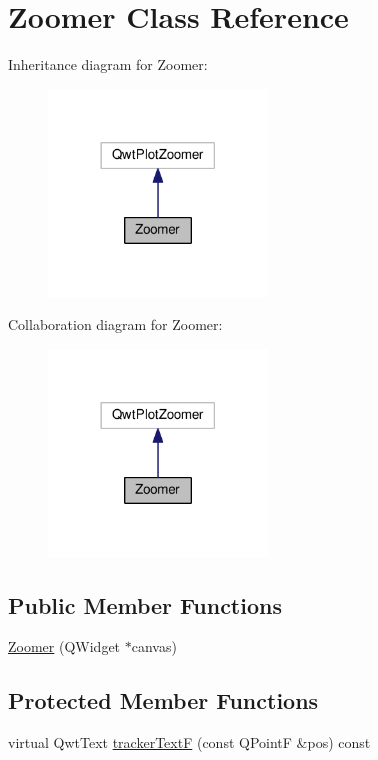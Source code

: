 \hypertarget{class_zoomer}{}\section{Zoomer Class Reference}
\label{class_zoomer}


Inheritance diagram for Zoomer\+:
\nopagebreak
\begin{figure}[H]
\begin{center}
\leavevmode
\includegraphics[width=165pt]{class_zoomer__inherit__graph}
\end{center}
\end{figure}


Collaboration diagram for Zoomer\+:
\nopagebreak
\begin{figure}[H]
\begin{center}
\leavevmode
\includegraphics[width=165pt]{class_zoomer__coll__graph}
\end{center}
\end{figure}
\subsection*{Public Member Functions}
\begin{DoxyCompactItemize}
\item 
\hyperlink{class_zoomer_af4807c3ed06ecc9b5364d23f3f0e0423}{Zoomer} (Q\+Widget $\ast$canvas)
\end{DoxyCompactItemize}
\subsection*{Protected Member Functions}
\begin{DoxyCompactItemize}
\item 
virtual Qwt\+Text \hyperlink{class_zoomer_a381235371bde8df3d8503e7c35750521}{tracker\+Text\+F} (const Q\+Point\+F \&pos) const 
\end{DoxyCompactItemize}


